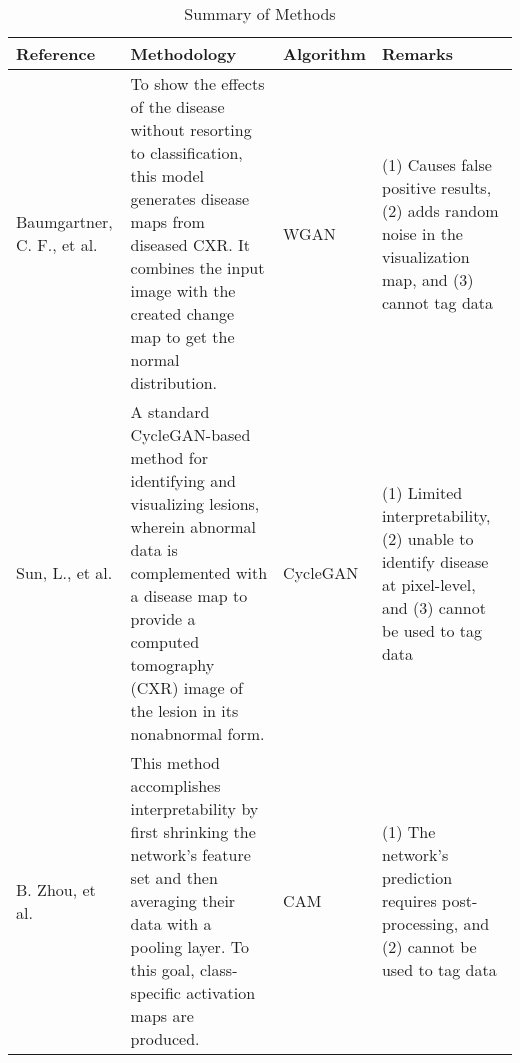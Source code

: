 {\begin{table}[h!]
\centering
\caption{\label{tab:example1}Summary of Methods}
\bigskip
\begin{tabular}{| p{2cm}|p{4cm}|p{2cm}|p{4cm}|}
\hline
\textbf{Reference} & \textbf{Methodology} & \textbf{Algorithm} & \textbf{Remarks} \\
\hline
Baumgartner, C. F., et al. \cite{15} & To show the effects of the disease without resorting to classification, this model generates disease maps from diseased CXR. It combines the input image with the created change map to get the normal distribution. & WGAN & (1) Causes false positive results, (2) adds random noise in the visualization map, and (3) cannot tag data \\
\hline
Sun, L., et al. \cite{16} & A standard CycleGAN-based method for identifying and visualizing lesions, wherein abnormal data is complemented with a disease map to provide a computed tomography (CXR) image of the lesion in its nonabnormal form. & CycleGAN & (1) Limited interpretability, (2) unable to identify disease at pixel-level, and (3) cannot be used to tag data  \\
\hline
B. Zhou, et al. \cite{26} & This method accomplishes interpretability by first shrinking the network's feature set and then averaging their data with a pooling layer. To this goal, class-specific activation maps are produced. & CAM & (1) The network's prediction requires post-processing, and (2) cannot be used to tag data\\
\hline
\end{tabular}

\end{table}
}